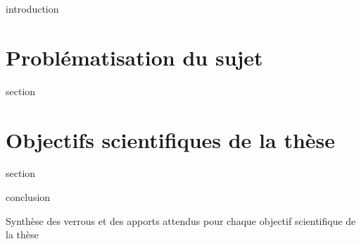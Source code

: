 \chaptertoc{}

\label{sec:2-int}
{introduction}

\section{Problématisation du sujet}
\label{sec:2-1}
{section}

\section{Objectifs scientifiques de la thèse}
\label{sec:2-2}
{section}

\label{sec:2-cnc}
{conclusion}

\begin{landscape}
  \begin{table}[!h]
    \centering
    
    \caption{Synthèse des verrous et des apports attendus pour chaque
      objectif scientifique de la thèse}
    \label{tab:synthese_objectifs}
  \end{table}
\end{landscape}

